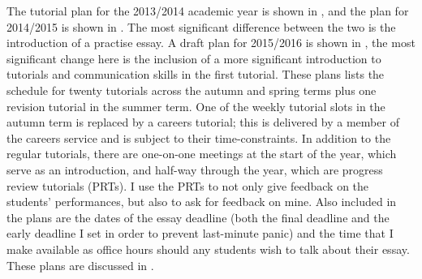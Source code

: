 The tutorial plan for the 2013/2014 academic year is shown in , and the plan for 2014/2015 is shown in . The most significant difference between the two is the introduction of a practise essay. A draft plan for 2015/2016 is shown in , the most significant change here is the inclusion of a more significant introduction to tutorials and communication skills in the first tutorial. These plans lists the schedule for twenty tutorials across the autumn and spring terms plus one revision tutorial in the summer term. One of the weekly tutorial slots in the autumn term is replaced by a careers tutorial; this is delivered by a member of the careers service and is subject to their time-constraints. In addition to the regular tutorials, there are one-on-one meetings at the start of the year, which serve as an introduction, and half-way through the year, which are progress review tutorials (PRTs). I use the PRTs to not only give feedback on the students' performances, but also to ask for feedback on mine. Also included in the plans are the dates of the essay deadline (both the final deadline and the early deadline I set in order to prevent last-minute panic) and the time that I make available as office hours should any students wish to talk about their essay. These plans are discussed in .
